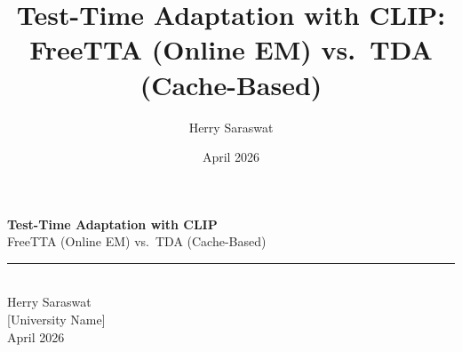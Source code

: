 \documentclass[aspectratio=169,11pt]{beamer}
\title[FreeTTA vs TDA]{Test-Time Adaptation with CLIP:\\
\large FreeTTA (Online EM) vs.\ TDA (Cache-Based)}
\author[Herry Saraswat]{Herry Saraswat}
\institute{[University Name]}
\date{April 2026}
\begin{document}
{
\begin{frame}[plain]
\vfill
\begin{center}
  {\color{white}\LARGE\textbf{Test-Time Adaptation with CLIP}}\\[10pt]
  {\color{white!85}\large FreeTTA (Online EM) vs.\ TDA (Cache-Based)}\\[6pt]
  {\color{accent!50!white}\rule{0.55\textwidth}{0.8pt}}\\[18pt]
  {\color{white}\large Herry Saraswat}\\[6pt]
  {\color{white!80}\normalsize [University Name]}\\[6pt]
  {\color{white!70}\small April 2026}
\end{center}
\vfill
\end{frame}
}
\end{document}

